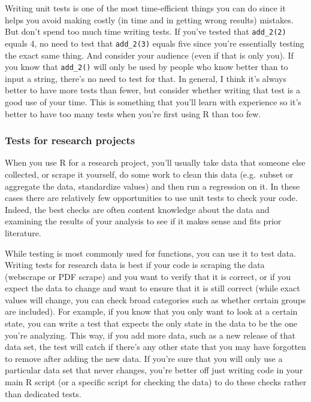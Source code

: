 \documentclass[
  a4paper,
]{krantz}
\begin{document}
Writing unit tests is one of the most time-efficient things
you can do since it helps you avoid making costly (in time
and in getting wrong results) mistakes. But don't spend too
much time writing tests. If you've tested that
\texttt{add\_2(2)} equals 4, no need to test that
\texttt{add\_2(3)} equals five since you're essentially
testing the exact same thing. And consider your audience
(even if that is only you). If you know that
\texttt{add\_2()} will only be used by people who know
better than to input a string, there's no need to test for
that. In general, I think it's always better to have more
tests than fewer, but consider whether writing that test is
a good use of your time. This is something that you'll learn
with experience so it's better to have too many tests when
you're first using R than too few.

\hypertarget{tests-for-research-projects}{%
\subsubsection{Tests for research
projects}\label{tests-for-research-projects}}

When you use R for a research project, you'll usually take
data that someone else collected, or scrape it yourself, do
some work to clean this data (e.g.~subset or aggregate the
data, standardize values) and then run a regression on it.
In these cases there are relatively few opportunities to use
unit tests to check your code. Indeed, the best checks are
often content knowledge about the data and examining the
results of your analysis to see if it makes sense and fits
prior literature.

While testing is most commonly used for functions, you can
use it to test data. Writing tests for research data is best
if your code is scraping the data (webscrape or PDF scrape)
and you want to verify that it is correct, or if you expect
the data to change and want to ensure that it is still
correct (while exact values will change, you can check broad
categories such as whether certain groups are included). For
example, if you know that you only want to look at a certain
state, you can write a test that expects the only state in
the data to be the one you're analyzing. This way, if you
add more data, such as a new release of that data set, the
test will catch if there's any other state that you may have
forgotten to remove after adding the new data. If you're
sure that you will only use a particular data set that never
changes, you're better off just writing code in your main R
script (or a specific script for checking the data) to do
these checks rather than dedicated tests.
\end{document}
